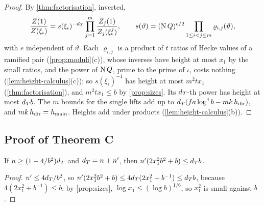 \begin{proof}
By \cref{thm:factorisation}, inverted,
\[
  \frac{Z(1)}{Z(\xi_\iota)}=s(\xi_\iota)^{-d_T}\prod_{j=1}^m\frac{Z_j(1)}{Z_j(\xi^j_\iota)},\qquad s(\vartheta)=(\operatorname{N} Q)^{e/2}\prod_{1\le i<j\le m}\varrho_{i,j}(\vartheta),
\]
with $e$ independent of $\vartheta$. Each $\varrho_{i,j}$ is a product of $t$ ratios of Hecke values of a ramified pair (\cref{prop:moduli}(c)), whose inverses have height at most $x_1$ by the small ratios, and the power of $\operatorname{N} Q$,
prime to the prime of $\iota$, costs nothing (\cref{lem:height-calculus}(c)); so $s(\xi_\iota)^{-1}$ has height at most $m^2tx_1$ (\cref{thm:factorisation}), and $m^2tx_1\le b$ by \cref{prop:sizes}. Its $d_T$-th power has height at most $d_T b$. The $m$
bounds for the single lifts add up to $d_T(fa\log^4b-mk\,h_{\mathrm{dir}})$, and $mk\,h_{\mathrm{dir}}=h_{\mathrm{main}}$. Heights add under products (\cref{lem:height-calculus}(b)).
\end{proof}

\subsection{Proof of Theorem C}\label{ss:proof-C}

\begin{lemma}\label{lem:completion-cost}
If $n\ge(1-4/b^2)d_T$ and $d_T=n+n'$, then $n'(2x_1^2b^2+b)\le d_T b$.
\end{lemma}

\begin{proof}
$n'\le4d_T/b^2$, so $n'(2x_1^2b^2+b)\le4d_T(2x_1^2+b^{-1})\le d_T b$, because $4(2x_1^2+b^{-1})\le b$: by \cref{prop:sizes}, $\log x_1\le(\log b)^{1/6}$, so $x_1^2$ is small against $b$.
\end{proof}

